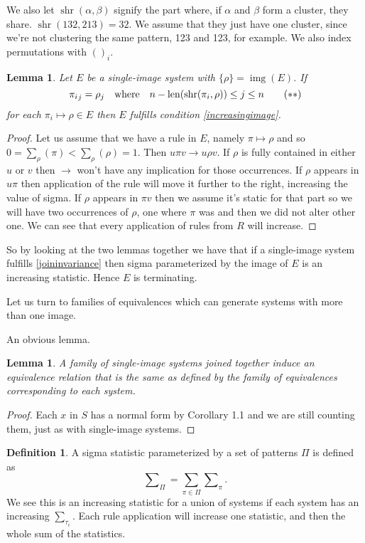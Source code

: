 \documentclass[openany, a4paper, 11pt, english]{article}
\newcommand{\patternrule}{ \mapsto \!}
\newtheorem{lemma}[theorem]{Lemma}
\theoremstyle{definition}
\newtheorem{definition}[theorem]{Definition}
\newcommand{\Sym}{S}
\DeclareMathOperator{\img}{img}
\DeclareMathOperator{\len}{len}
\DeclareMathOperator{\shr}{shr}
\begin{document}
 We also let $\shr(\alpha,
\beta)$ signify the part where, if $\alpha$ and $\beta$ form a cluster, they
share. $\shr(132, 213) = 32$. We assume that they just have one cluster, since
we're not clustering the same pattern, 123 and 123, for example. We also index
permutations with $()_i$.

\begin{lemma}
    Let $E$ be a single-image system with $\{\rho\} = \img(E)$. If
    \[
        {\pi_i}_j = \rho_j \quad \textnormal{where} \quad n-\len(\shr(\pi_i,
        \rho)) \leq j \leq n \tag{$\ast\ast$} \label{joininvariance}
    \]
    for each $\pi_i \patternrule \rho \in E$ then $E$ fulfills condition
    \eqref{increasingimage}. \end{lemma}
\begin{proof}
    Let us assume that we have a rule in $E$, namely $\pi \patternrule \rho$ and so
    $0 = \sum_\rho(\pi) < \sum_\rho(\rho) = 1$. Then $u \pi v \to u \rho v$. 
    If $\rho$ is fully contained in either $u$ or $v$ then $\to$ won't have any
    implication for those occurrences. If $\rho$ appears in $u\pi$ then
    application of the rule will move it further to the right, increasing the
    value of sigma. If $\rho$ appears in $\pi v$ then we assume it's static for
    that part so we will have two occurrences of $\rho$, one where $\pi$ was and
    then we did not alter other one.
    We can see that every application of rules from $R$ will increase.
\end{proof}

So by looking at the two lemmas together we have that if a single-image system
fulfills \eqref{joininvariance} then sigma parameterized by the image of $E$ is
an increasing statistic. Hence $E$ is terminating.

Let us turn to families of equivalences which can generate systems with more
than one image.

An obvious lemma.
\begin{lemma}
    A family of single-image systems joined together induce an equivalence
    relation that is the same as defined by the family of equivalences
    corresponding to each system.
\end{lemma}
\begin{proof}
    Each $x$ in $\Sym$ has a normal form by Corollary 1.1 and we are still counting
    them, just as with single-image systems.
\end{proof}

\begin{definition}
    A sigma statistic parameterized by a set of patterns $\Pi$ is defined as
    $$
        \sum\nolimits_\Pi = \sum_{\pi \in \Pi} \sum\nolimits_{\pi}.
    $$
    We see this is an increasing statistic for a union of systems if
    each system has an increasing $\sum_{\tau_i}$.  Each rule application will
    increase one statistic, and then the whole sum of the statistics.
\end{definition}
\end{document}

